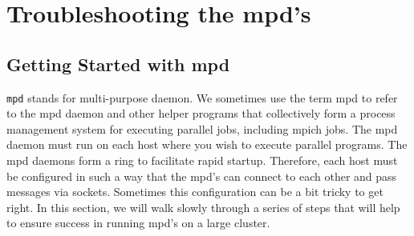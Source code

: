 \documentclass[dvipdfm,11pt]{article}
\begin{document}
\appendix


\section{Troubleshooting the mpd's}
\label{app:mpd}



\subsection{Getting Started with mpd}
\label{sec:getting-started}

\texttt{mpd} stands for multi-purpose daemon.  We sometimes use the term
mpd to refer to the mpd daemon and other helper programs that
collectively form a process management system for executing
parallel jobs, including mpich jobs.  The mpd daemon must
run on each host where you wish to execute parallel programs.
The mpd daemons form a ring to facilitate rapid startup.
Therefore, each host must be configured in such a way that the
mpd's can connect to each other and pass messages via sockets.
Sometimes this configuration can be a bit tricky to get right.
In this section, we will walk slowly through a series of steps
that will help to ensure success in running mpd's on a large cluster.
\end{document}
